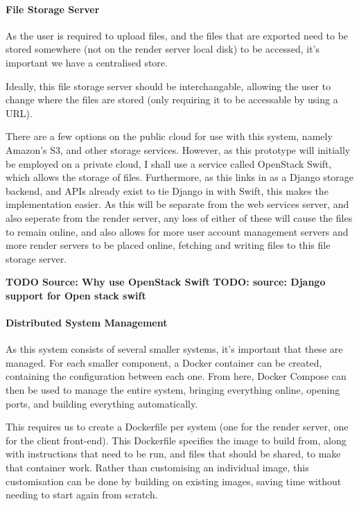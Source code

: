 \documentclass[12pt,a4paper]{article}
\begin{document}
\paragraph{File Storage Server}
As the user is required to upload files, and the files that are exported need to be stored
somewhere (not on the render server local disk) to be accessed, it's important we have a
centralised store.

Ideally, this file storage server should be interchangable, allowing the user to change
where the files are stored (only requiring it to be accessable by using a URL).

There are a few options on the public cloud for use with this system, namely Amazon's S3,
and other storage services. However, as this prototype will initially be employed on a
private cloud, I shall use a service called OpenStack Swift, which allows the storage of files.
Furthermore, as this links in as a Django storage backend, and APIs already exist to tie Django in
with Swift, this makes the implementation easier. As this will be separate from the web services server,
and also seperate from the render server, any loss of either of these will cause the files to remain online,
and also allows for more user account management servers and more render servers to be placed online,
fetching and writing files to this file storage server.

\textbf{TODO Source: Why use OpenStack Swift}
\textbf{TODO: source: Django support for Open stack swift}

\paragraph{Distributed System Management}
As this system consists of several smaller systems, it's important that these are
managed. For each smaller component, a Docker container can be created, containing the
configuration between each one. From here, Docker Compose can then be used to manage
the entire system, bringing everything online, opening ports, and building everything
automatically.

This requires us to create a Dockerfile per system (one for the render server,
one for the client front-end). This Dockerfile specifies the image to build from,
along with instructions that need to be run, and files that should be shared, to make
that container work. Rather than customising an individual image, this customisation can be done
by building on existing images, saving time without needing to start again from scratch. \cite{DockerWhyItsUseful}
\end{document}
